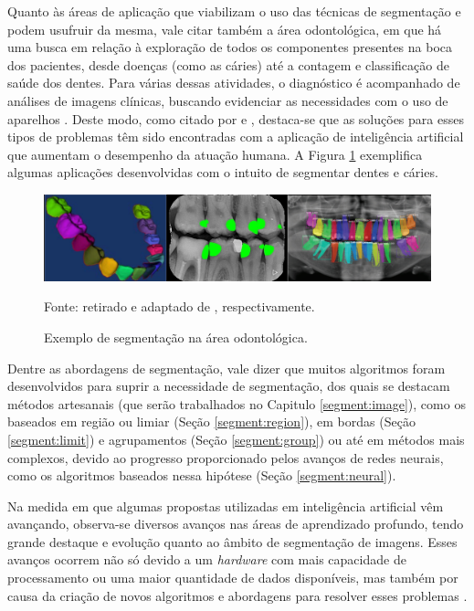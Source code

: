 Quanto às áreas de aplicação que viabilizam o uso das técnicas de segmentação e podem usufruir da mesma, vale citar também a área odontológica, em que há uma busca em relação à exploração de todos os componentes presentes na boca dos pacientes, desde doenças (como as cáries) até a contagem e classificação de saúde dos dentes. Para várias dessas atividades, o diagnóstico é acompanhado de análises de imagens clínicas, buscando evidenciar as necessidades com o uso de aparelhos \citep{Schwendicke2020}. Deste modo, como citado por \cite{Bansal2021, Nguyen2021} e \cite{Schwendicke2020}, destaca-se que as soluções para esses tipos de problemas têm sido encontradas com a aplicação de inteligência artificial que aumentam o desempenho da atuação humana. A Figura \ref{intro:fig:4} exemplifica algumas aplicações desenvolvidas com o intuito de segmentar dentes e cáries.

\begin{figure}[H]
    \centering
    \caption{Exemplo de segmentação na área odontológica.}
    \includegraphics[width=1\linewidth]{recursos/imagens/introduction/odonto_segmentation.png}
    \label{intro:fig:4}

    Fonte: retirado e adaptado de \cite{Shuai2016,Bayrakdar2021,Gil2019}, respectivamente.
\end{figure}

Dentre as abordagens de segmentação, vale dizer que muitos algoritmos foram desenvolvidos para suprir a necessidade de segmentação, dos quais se destacam métodos artesanais (que serão trabalhados no Capitulo \ref{segment:image}), como os baseados em região ou limiar (Seção \ref{segment:region}), em bordas (Seção \ref{segment:limit}) e agrupamentos (Seção \ref{segment:group}) ou até em métodos mais complexos, devido ao progresso proporcionado pelos avanços de redes neurais, como os algoritmos baseados nessa hipótese (Seção \ref{segment:neural}).

Na medida em que algumas propostas utilizadas em inteligência artificial vêm avançando, observa-se diversos avanços nas áreas de aprendizado profundo, tendo grande destaque e evolução quanto ao âmbito de segmentação de imagens. Esses avanços ocorrem não só devido a um \textit{hardware} com mais capacidade de processamento ou uma maior quantidade de dados disponíveis, mas também por causa da criação de novos algoritmos e abordagens para resolver esses problemas \citep{Szegedy2015}.

